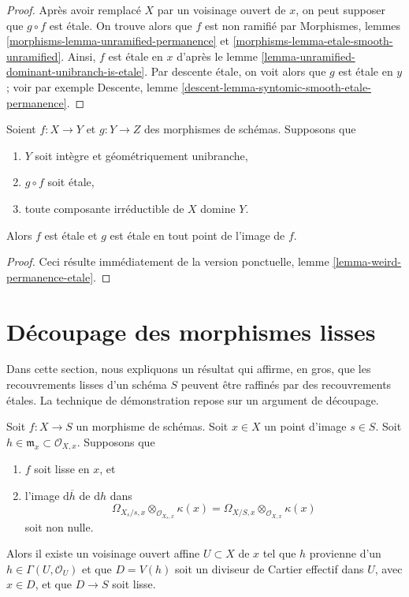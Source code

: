 \begin{proof}
Après avoir remplacé $X$ par un voisinage ouvert de $x$,
on peut supposer que $g \circ f$ est \'etale.
On trouve alors que $f$ est non ramifié par Morphismes, lemmes
\ref{morphisms-lemma-unramified-permanence}
et \ref{morphisms-lemma-etale-smooth-unramified}.
Ainsi, $f$ est \'etale en $x$ d'après le
lemme \ref{lemma-unramified-dominant-unibranch-is-etale}.
Par descente \'etale, on voit alors que $g$ est \'etale en $y$ ; voir
par exemple Descente, lemme
\ref{descent-lemma-syntomic-smooth-etale-permanence}.
\end{proof}

\begin{lemma}
\label{lemma-global-weird-permanence-etale}
Soient $f : X \to Y$ et $g : Y \to Z$ des morphismes de schémas.
Supposons que
\begin{enumerate}
\item $Y$ soit intègre et géométriquement unibranche,
\item $g \circ f$ soit \'etale,
\item toute composante irréductible de $X$ domine $Y$.
\end{enumerate}
Alors $f$ est \'etale et $g$ est \'etale en tout point de
l'image de $f$.
\end{lemma}

\begin{proof}
Ceci résulte immédiatement de la version ponctuelle,
lemme \ref{lemma-weird-permanence-etale}.
\end{proof}










\section{Découpage des morphismes lisses}
\label{section-etale-over-smooth}

\noindent
Dans cette section, nous expliquons un résultat qui affirme, en gros, que
les recouvrements lisses d'un schéma $S$ peuvent être raffinés par des recouvrements \'etales.
La technique de démonstration repose sur un argument de découpage.

\begin{lemma}
\label{lemma-slice-smooth-given-element}
Soit $f : X \to S$ un morphisme de schémas.
Soit $x \in X$ un point d'image $s \in S$.
Soit $h \in \mathfrak m_x \subset \mathcal{O}_{X, x}$.
Supposons que
\begin{enumerate}
\item $f$ soit lisse en $x$, et
\item l'image $\text{d}\overline{h}$ de $\text{d}h$ dans
$$
\Omega_{X_s/s, x} \otimes_{\mathcal{O}_{X_s, x}} \kappa(x) =
\Omega_{X/S, x} \otimes_{\mathcal{O}_{X, x}} \kappa(x)
$$
soit non nulle.
\end{enumerate}
Alors il existe un voisinage ouvert affine $U \subset X$ de $x$
tel que $h$ provienne d'un $h \in \Gamma(U, \mathcal{O}_U)$ et
que $D = V(h)$ soit un diviseur de Cartier effectif dans $U$, avec $x \in D$, et que
$D \to S$ soit lisse.
\end{lemma}

